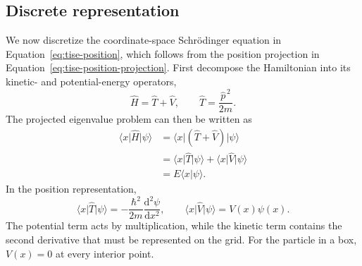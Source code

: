 \documentclass[11pt]{article}
\begin{document}
\subsection{Discrete representation}

We now discretize the coordinate-space Schr\"odinger equation in
Equation~\eqref{eq:tise-position}, which follows from the position projection in
Equation~\eqref{eq:tise-position-projection}. First decompose the Hamiltonian into its
kinetic- and potential-energy operators,
\begin{equation}
 \widehat H=\widehat T+\widehat V,
 \qquad
 \widehat T=\frac{\widehat p^{\,2}}{2m}.
 \label{eq:hamiltonian-decomposition}
\end{equation}
The projected eigenvalue problem can then be written as
\begin{align}
 \langle x\rvert\widehat H\lvert\psi\rangle
 &=\langle x\rvert(\widehat T+\widehat V)\lvert\psi\rangle \\
 &=\langle x\rvert\widehat T\lvert\psi\rangle
  +\langle x\rvert\widehat V\lvert\psi\rangle \\
 &=E\langle x\vert\psi\rangle.
 \label{eq:projected-decomposition}
\end{align}
In the position representation,
\begin{equation}
 \langle x\rvert\widehat T\lvert\psi\rangle
 =-\frac{\hbar^2}{2m}\frac{\mathrm{d}^2\psi}{\mathrm{d}x^2},
 \qquad
 \langle x\rvert\widehat V\lvert\psi\rangle=V(x)\psi(x).
 \label{eq:position-operator-actions}
\end{equation}
The potential term acts by multiplication, while the kinetic term contains the
second derivative that must be represented on the grid. For the particle in a box,
$V(x)=0$ at every interior point.
\end{document}
